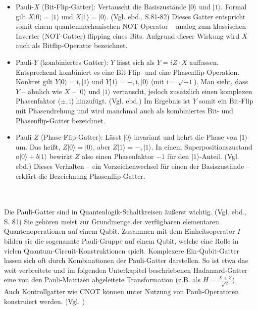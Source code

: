 \begin{itemize}
\item Pauli-$X$ (Bit-Flip-Gatter): Vertauscht die Basiszustände $|0\rangle$ und $|1\rangle$. Formal gilt $X|0\rangle = |1\rangle$ und $X|1\rangle = |0\rangle$. (Vgl. ebd., S.81-82) Dieses Gatter entspricht somit einem quantenmechanischen NOT-Operator – analog zum klassischen Inverter (NOT-Gatter) flipping eines Bits. Aufgrund dieser Wirkung wird $X$ auch als Bitflip-Operator bezeichnet. 

\item Pauli-$Y$ (kombiniertes Gatter): $Y$ lässt sich als $Y = iZ \cdot X$ auffassen. Entsprechend kombiniert es eine Bit-Flip- und eine Phasenflip-Operation. Konkret gilt $Y|0\rangle = \mathrm{i},|1\rangle$ und $Y|1\rangle = -,\mathrm{i},|0\rangle$ (mit $\mathrm{i}=\sqrt{-1}$). Man sieht, dass $Y$ – ähnlich wie $X$ – $|0\rangle$ und $|1\rangle$ vertauscht, jedoch zusätzlich einen komplexen Phasenfaktor ($\pm,\mathrm{i}$) hinzufügt. (Vgl. ebd.) Im Ergebnis ist $Y$ somit ein Bit-Flip mit Phasendrehung und wird manchmal auch als kombiniertes Bit- und Phasenflip-Gatter bezeichnet.

\item Pauli-$Z$ (Phase-Flip-Gatter): Lässt $|0\rangle$ invariant und kehrt die Phase von $|1\rangle$ um. Das heißt, $Z|0\rangle = |0\rangle$, aber $Z|1\rangle = -,|1\rangle$. In einem Superpositionszustand $a|0\rangle + b|1\rangle$ bewirkt $Z$ also einen Phasenfaktor $-1$ für den $|1\rangle$-Anteil. (Vgl. ebd.) Dieses Verhalten – ein Vorzeichenwechsel für einen der Basiszustände – erklärt die Bezeichnung Phasenflip-Gatter.
\end{itemize}\\
\\
Die Pauli-Gatter sind in Quantenlogik-Schaltkreisen äußerst wichtig. (Vgl. ebd., S. 81) Sie gehören meist zur Grundmenge der verfügbaren elementaren Quantenoperationen auf einem Qubit. Zusammen mit dem Einheitsoperator $I$ bilden sie die sogenannte Pauli-Gruppe auf einem Qubit, welche eine Rolle in vielen Quantum-Circuit-Konstruktionen spielt. Komplexere Ein-Qubit-Gatter lassen sich oft durch Kombinationen der Pauli-Gatter darstellen. So ist etwa das weit verbreitete und im folgenden Unterkapitel \pageref{subsubsec:hadamard_superposition} beschriebenen Hadamard-Gatter eine von den Pauli-Matrizen abgeleitete Transformation (z.B. als $H = \frac{X+Z}{\sqrt{2}}$). Auch Kontrollgatter wie CNOT können unter Nutzung von Pauli-Operatoren konstruiert werden. (Vgl. \cite[S.312]{wekesa_sirengo_mathematical_2024})\\
\\

